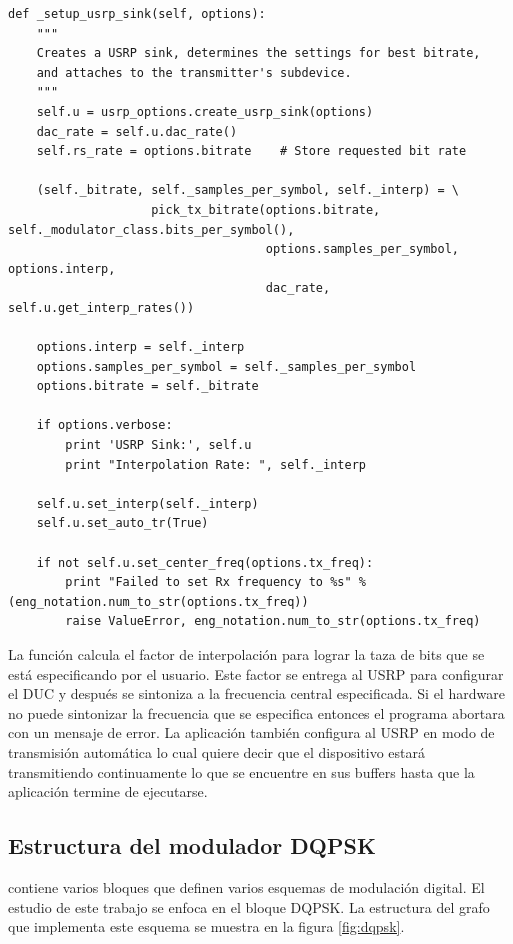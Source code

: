 \begin{lstlisting}[float, label=ex:usrptxsetup, caption={Funci\'on que configura el USRP como
transmisor}, breaklines=true]
def _setup_usrp_sink(self, options):
    """
    Creates a USRP sink, determines the settings for best bitrate,
    and attaches to the transmitter's subdevice.
    """
    self.u = usrp_options.create_usrp_sink(options)
    dac_rate = self.u.dac_rate()
    self.rs_rate = options.bitrate    # Store requested bit rate
        
    (self._bitrate, self._samples_per_symbol, self._interp) = \
                    pick_tx_bitrate(options.bitrate, self._modulator_class.bits_per_symbol(),
                                    options.samples_per_symbol, options.interp,
                                    dac_rate, self.u.get_interp_rates())

    options.interp = self._interp
    options.samples_per_symbol = self._samples_per_symbol
    options.bitrate = self._bitrate

    if options.verbose:
        print 'USRP Sink:', self.u
        print "Interpolation Rate: ", self._interp
    
    self.u.set_interp(self._interp)
    self.u.set_auto_tr(True)

    if not self.u.set_center_freq(options.tx_freq):
        print "Failed to set Rx frequency to %s" % (eng_notation.num_to_str(options.tx_freq))
        raise ValueError, eng_notation.num_to_str(options.tx_freq)
\end{lstlisting}

La funci\'on calcula el factor de interpolaci\'on para lograr la taza de bits que se est\'a
especificando por el usuario. Este factor se entrega al USRP para configurar el DUC y despu\'es se
sintoniza a la frecuencia central especificada. Si el hardware no puede sintonizar la frecuencia que
se especifica entonces el programa abortara con un mensaje de error. La aplicaci\'on tambi\'en
configura al USRP en modo de transmisi\'on autom\'atica lo cual quiere decir que el dispositivo
estar\'a transmitiendo continuamente lo que se encuentre en sus buffers hasta que la aplicaci\'on
termine de ejecutarse.

\subsection{Estructura del modulador DQPSK}\label{subsec:estrucdqpsk}
\gnuradio contiene varios bloques que definen varios esquemas de modulaci\'on digital. El estudio de
este trabajo se enfoca en el bloque DQPSK. La estructura del grafo que implementa este esquema se
muestra en la figura \ref{fig:dqpsk}.

